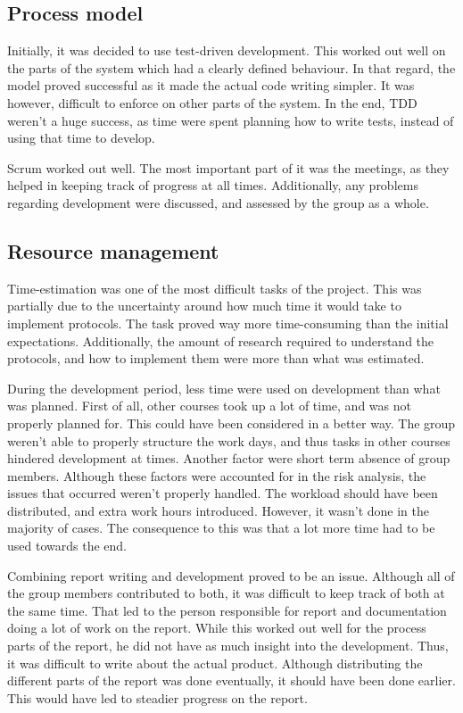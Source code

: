 \subsection{Process model}
\label{subsec:project_evaluation-development-process_model}

Initially, it was decided to use test-driven development. This worked out well on the parts of the system which had a clearly defined behaviour. In that regard, the model proved successful as it made the actual code writing simpler. It was however, difficult to enforce on other parts of the system. In the end, TDD weren't a huge success, as time were spent planning how to write tests, instead of using that time to develop. 

Scrum worked out well. The most important part of it was the meetings, as they helped in keeping track of progress at all times. Additionally, any problems regarding development were discussed, and assessed by the group as a whole.

\subsection{Resource management}
\label{subsec:project_evaluation-development-time_management}

Time-estimation was one of the most difficult tasks of the project. This was partially due to the uncertainty around how much time it would take to implement protocols. The task proved way more time-consuming than the initial expectations. Additionally, the amount of research required to understand the protocols, and how to implement them were more than what was estimated.

During the development period, less time were used on development than what was planned. First of all, other courses took up a lot of time, and was not properly planned for. This could have been considered in a better way. The group weren't able to properly structure the work days, and thus tasks in other courses hindered development at times. Another factor were short term absence of group members. Although these factors were accounted for in the risk analysis, the issues that occurred weren't properly handled. The workload should have been distributed, and extra work hours introduced. However, it wasn't done in the majority of cases. The consequence to this was that a lot more time had to be used towards the end.

Combining report writing and development proved to be an issue. Although all of the group members contributed to both, it was difficult to keep track of both at the same time. That led to the person responsible for report and documentation doing a lot of work on the report. While this worked out well for the process parts of the report, he did not have as much insight into the development. Thus, it was difficult to write about the actual product. Although distributing the different parts of the report was done eventually, it should have been done earlier. This would have led to steadier progress on the report.

